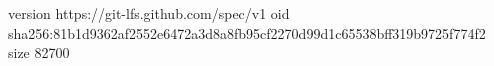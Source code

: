 version https://git-lfs.github.com/spec/v1
oid sha256:81b1d9362af2552e6472a3d8a8fb95cf2270d99d1c65538bff319b9725f774f2
size 82700
